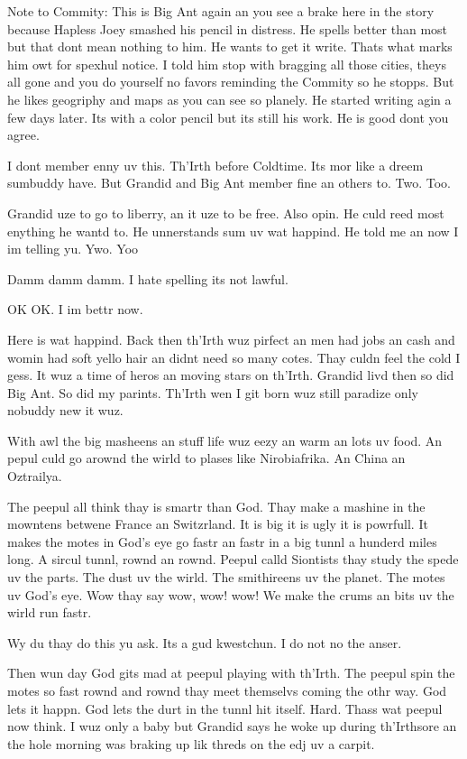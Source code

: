 \documentclass[10pt,a4paper]{article}
\begin{document}
Note to Commity: This is Big Ant again an you see a brake here in the story because Hapless Joey smashed his pencil in distress. He spells better than most but that dont mean nothing to him. He wants to get it write. Thats what marks him owt for spexhul notice. I told him stop with bragging all those cities, theys all gone and you do yourself no favors reminding the Commity so he stopps. But he likes geogriphy and maps as you can see so planely. He started writing agin a few days later. Its with a color pencil but its still his work. He is good dont you agree.

I dont member enny uv this. Th’Irth before Coldtime. Its mor like a dreem sumbuddy have. But Grandid and Big Ant member fine an others to. Two. Too.

Grandid uze to go to liberry, an it uze to be free. Also opin. He culd reed most enything he wantd to. He unnerstands sum uv wat happind. He told me an now I im telling yu. Ywo. Yoo

Damm damm damm. I hate spelling its not lawful.

OK OK. I im bettr now.

Here is wat happind. Back then th’Irth wuz pirfect an men had jobs an cash and womin had soft yello hair an didnt need so many cotes. Thay culdn feel the cold I gess. It wuz a time of heros an moving stars on th’Irth. Grandid livd then so did Big Ant. So did my parints. Th’Irth wen I git born wuz still paradize only nobuddy new it wuz.

With awl the big masheens an stuff life wuz eezy an warm an lots uv food. An pepul culd go arownd the wirld to plases like Nirobiafrika. An China an Oztrailya.

The peepul all think thay is smartr than God. Thay make a mashine in the mowntens betwene France an Switzrland. It is big it is ugly it is powrfull. It makes the motes in God’s eye go fastr an fastr in a big tunnl a hunderd miles long. A sircul tunnl, rownd an rownd. Peepul calld Siontists thay study the spede uv the parts. The dust uv the wirld. The smithireens uv the planet. The motes uv God’s eye. Wow thay say wow, wow! wow! We make the crums an bits uv the wirld run fastr.

Wy du thay do this yu ask. Its a gud kwestchun. I do not no the anser.

Then wun day God gits mad at peepul playing with th’Irth. The peepul spin the motes so fast rownd and rownd thay meet themselvs coming the othr way. God lets it happn. God lets the durt in the tunnl hit itself. Hard. Thass wat peepul now think. I wuz only a baby but Grandid says he woke up during th’Irthsore an the hole morning was braking up lik threds on the edj uv a carpit.
\end{document}
